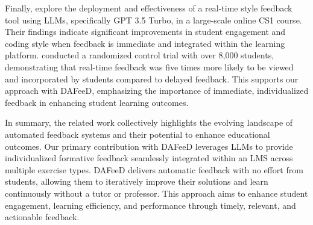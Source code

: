 \documentclass[manuscript,screen,review]{acmart}
\begin{document}
Finally, \citet{woodrow:2024:AITeachesArt} explore the deployment and effectiveness of a real-time style feedback tool using LLMs, specifically GPT 3.5 Turbo, in a large-scale online CS1 course. Their findings indicate significant improvements in student engagement and coding style when feedback is immediate and integrated within the learning platform. \citeauthor{woodrow:2024:AITeachesArt} conducted a randomized control trial with over 8,000 students, demonstrating that real-time feedback was five times more likely to be viewed and incorporated by students compared to delayed feedback. This supports our approach with DAFeeD, emphasizing the importance of immediate, individualized feedback in enhancing student learning outcomes.


In summary, the related work collectively highlights the evolving landscape of automated feedback systems and their potential to enhance educational outcomes. Our primary contribution with DAFeeD leverages LLMs to provide individualized formative feedback seamlessly integrated within an LMS across multiple exercise types. DAFeeD delivers automatic feedback with no effort from students, allowing them to iteratively improve their solutions and learn continuously without a tutor or professor. This approach aims to enhance student engagement, learning efficiency, and performance through timely, relevant, and actionable feedback.






\end{document}
